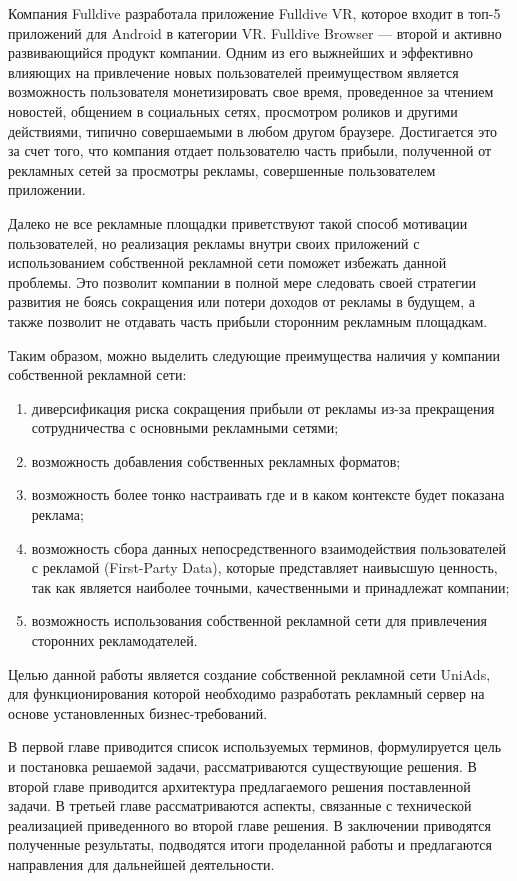 \documentclass[times]{itmo-student-thesis}
\begin{document}
Компания Fulldive разработала приложение Fulldive VR, которое входит в топ-5 приложений для Android в категории VR. Fulldive Browser — второй и активно развивающийся продукт компании. Одним из его выжнейших и эффективно влияющих на привлечение новых пользователей преимуществом является возможность пользователя монетизировать свое время, проведенное за чтением новостей, общением в социальных сетях, просмотром роликов и другими действиями, типично совершаемыми в любом другом браузере. Достигается это за счет того, что компания отдает пользователю часть прибыли, полученной от рекламных сетей за просмотры рекламы, совершенные пользователем приложении. 

Далеко не все рекламные площадки приветствуют такой способ мотивации пользователей, но реализация рекламы внутри своих приложений с использованием собственной рекламной сети поможет избежать данной проблемы. Это позволит компании в полной мере следовать своей стратегии развития не боясь сокращения или потери доходов от рекламы в будущем, а также позволит не отдавать часть прибыли сторонним рекламным площадкам.

Таким образом, можно выделить следующие преимущества наличия у компании собственной рекламной сети:
\begin{enumerate}
	\item диверсификация риска сокращения прибыли от рекламы из-за прекращения сотрудничества с основными рекламными сетями;
	\item возможность добавления собственных рекламных форматов;
	\item возможность более тонко настраивать где и в каком контексте будет показана реклама;
	\item возможность сбора данных непосредственного взаимодействия пользователей с рекламой (First-Party Data), которые представляет наивысшую ценность, так как является наиболее точными, качественными и принадлежат компании;
	\item возможность использования собственной рекламной сети для привлечения сторонних рекламодателей.
\end{enumerate}

Целью данной работы является создание собственной рекламной сети UniAds, для функционирования которой необходимо разработать рекламный сервер на основе установленных бизнес-требований.

В первой главе приводится список используемых терминов, формулируется цель и постановка решаемой задачи, рассматриваются существующие решения. В второй главе приводится архитектура предлагаемого решения поставленной задачи. В третьей главе рассматриваются аспекты, связанные с технической реализацией приведенного во второй главе решения. В заключении приводятся полученные результаты, подводятся итоги проделанной работы и предлагаются направления для дальнейшей деятельности.
\end{document}
